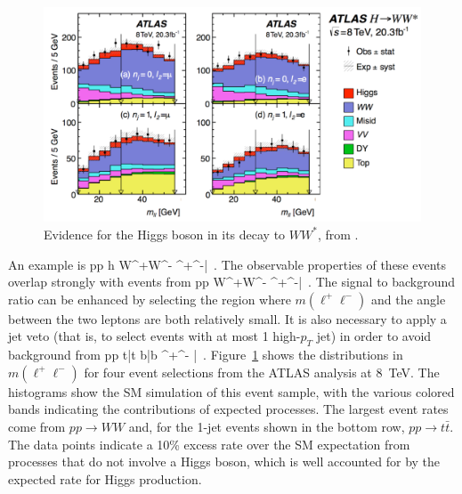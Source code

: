 \documentclass[12pt]{article}
\begin{document}
\begin{figure}
\begin{center}
\includegraphics[width=0.95\hsize]{ATLAShWW.pdf}
\end{center}
\caption{Evidence for the Higgs boson in its decay to $WW^*$, from
  \cite{ATLASWW}. }
\label{fig:ATLAShWW}
\end{figure}



An example is 
\beq
   pp \to h \to W^+W^- \to \ell^+\ell^-\nu\bar \nu  \ .
\eeqn
The observable properties of these events overlap strongly with events
from 
\beq
    pp \to W^+W^- \to  \ell^+\ell^-\nu\bar \nu  \ . 
\eeqn
The signal to background ratio can be enhanced by selecting the region
where $m(\ell^+\ell^-)$  and the angle between the two leptons are
both relatively small.   It is also necessary to apply a jet veto
(that is, to select events with at most 1 high-$p_T$ jet) in order to
avoid background from 
\beq
 pp \to t\bar t \to b\bar b \ell^+\ell^- \nu \bar\nu \ .
\eeqn
Figure~\ref{fig:ATLAShWW} shows the distributions in $m(\ell^+\ell^-)$
for four event selections from  the ATLAS analysis at 8~TeV. The
histograms
 show the SM simulation of this event sample, with the various colored
 bands indicating the contributions of expected processes.   The
 largest event rates come from $pp\to WW$ and, for the 1-jet events
 shown in the bottom row,
 $pp\to t\bar t$.   The data points indicate a 10\% excess rate over
 the SM expectation from processes that do not involve a Higgs boson,
 which is well accounted for by the expected rate for Higgs
 production.
\end{document}
